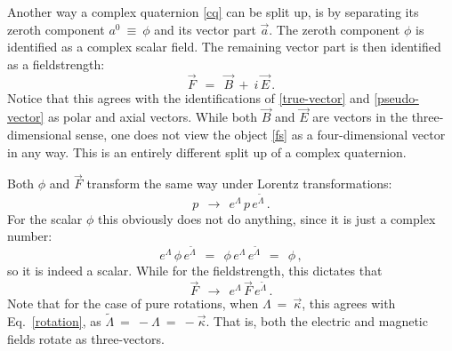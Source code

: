 \documentclass[epsfig,12pt]{article}
\newcommand{\wt}{\widetilde}
\begin{document}
	Another way a complex quaternion \eqref{cq} can be split up, is by separating its zeroth component $ a^0 ~\equiv~ \phi $
	and its vector part $ \vec a $.
	The zeroth component $ \phi $ is identified as a complex scalar field.
	The remaining vector part is then identified as a fieldstrength:
\begin{equation}
\label{fs}
	\vec F	~~=~~	\vec B  ~+~  i\,\vec E\,.
\end{equation}
	Notice that this agrees with the identifications of \eqref{true-vector} and \eqref{pseudo-vector}
	as polar and axial vectors.
	While both $ \vec B $ and $ \vec E $ are vectors in the three-dimensional sense,
	one does not view the object \eqref{fs} as a four-dimensional vector in any way.
	This is an entirely different split up of a complex quaternion.

	Both $ \phi $ and $ \vec F $ transform the same way under Lorentz transformations:
\begin{equation}
	p	~~\to~~	e^\Lambda\,p\,e^{\wt\Lambda}\,.
\end{equation}
	For the scalar $ \phi $ this obviously does not do anything, since it is just a complex number:
\[
	e^\Lambda\,\phi\,e^{\wt\Lambda}	~~=~~	\phi\, e^\Lambda\, e^{\wt\Lambda}	~~=~~	\phi\,,
\]
	so it is indeed a scalar.
	While for the fieldstrength, this dictates that
\begin{equation}
	\vec F		~~\to~~		e^\Lambda\,\vec F\,e^{\wt\Lambda}\,.
\end{equation}
	Note that for the case of pure rotations, when $ \Lambda ~=~ \vec\kappa $,
	this agrees with Eq.~\eqref{rotation}, as $ \wt\Lambda ~=~ -\Lambda ~=~ -\vec\kappa $.
	That is, both the electric and magnetic fields rotate as three-vectors.
\end{document}
